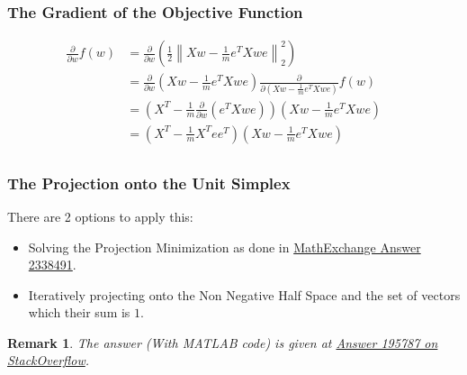 \documentclass[]{article}
\newtheorem*{remark}{Remark}
\newcommand{\MyParen}[1]{\left( #1 \right)}
\newcommand{\MyNormSqr}[2]{{\left\| #1 \right\|}_{#2}^{2}}
\newcommand{\MyNormTwoSqr}[1]{\MyNormSqr{#1}{2}}
\begin{document}
	\subsubsection*{The Gradient of the Objective Function}
	\begin{align*}
	\frac{\partial }{\partial w} f \MyParen{w} & = \frac{\partial }{\partial w} \MyParen{\frac{1}{2} \MyNormTwoSqr{ X w - \frac{1}{m} {e}^{T} X w e }} && \text{} \\
	& = \frac{\partial }{\partial w} \MyParen{ X w - \frac{1}{m} {e}^{T} X w e } \frac{\partial }{\partial \MyParen{X w - \frac{1}{m} {e}^{T} X w e}} f \MyParen{w} && \text{} \\
	& = \MyParen{ {X}^{T} - \frac{1}{m} \frac{\partial }{\partial w} \MyParen{{e}^{T} X w e} } \MyParen{X w - \frac{1}{m} {e}^{T} X w e} && \text{} \\
	& = \MyParen{ {X}^{T} - \frac{1}{m} {X}^{T} e {e}^{T} } \MyParen{X w - \frac{1}{m} {e}^{T} X w e} && \text{} \\
	\end{align*}
	
	\subsubsection*{The Projection onto the Unit Simplex}
	There are 2 options to apply this:
	\begin{itemize}
		\item Solving the Projection Minimization as done in \href{https://math.stackexchange.com/a/2338491}{MathExchange Answer 2338491}.
		\item Iteratively projecting onto the Non Negative Half Space and the set of vectors which their sum is $ 1 $.
	\end{itemize}
	
	\begin{remark}
		The answer (With MATLAB code) is given at \href{https://stackoverflow.com/a/44986301/195787}{Answer 195787 on StackOverflow}.
	\end{remark}
	
	
\end{document}
